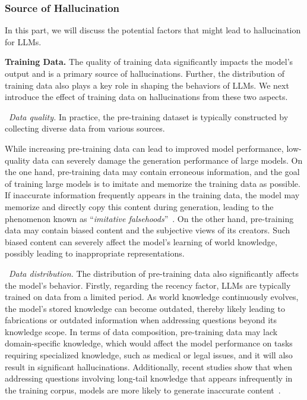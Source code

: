 \subsubsection{Source of Hallucination}

In this part, we will discuss the potential factors that might lead to hallucination for LLMs.

\textbf{Training Data.} The quality of training data significantly impacts the model's output and is a primary source of hallucinations. Further, the distribution of training data also plays a key role in shaping the behaviors of LLMs. We next introduce the effect of training data on hallucinations from these two aspects. 

\textbullet~\emph{Data quality.} In practice, the pre-training dataset is typically constructed by collecting diverse data from various sources. 

While increasing pre-training data can lead to improved model performance, low-quality data can severely damage the generation performance of large models. On the one hand, pre-training data may contain erroneous information, and the goal of training large models is to imitate and memorize the training data as possible. If inaccurate information frequently appears in the training data, the model may memorize and directly copy this content during generation, leading to the phenomenon known as ``\emph{imitative falsehoods}''~\cite{Lin-ACL-2022-TruthfulQA}. On the other hand, pre-training data may contain biased content and the subjective views of its creators. Such biased content can severely affect the model's learning of world knowledge, possibly leading to inappropriate representations.

\textbullet~\emph{Data distribution.} The distribution of pre-training data also significantly affects the model's behavior. Firstly, regarding the recency factor, LLMs are typically trained on data from a limited period. As world knowledge continuously evolves, the model's stored knowledge can become outdated, thereby likely leading to fabrications or outdated information when addressing questions beyond its knowledge scope. In terms of data composition, pre-training data may lack domain-specific knowledge, which would affect the model performance on tasks requiring specialized knowledge, such as medical or legal issues, and it will also result in significant hallucinations. Additionally, recent studies show that when addressing questions involving long-tail knowledge that appears infrequently in the training corpus, models are more likely to generate inaccurate content~\cite{Li-arxiv-2024-dawn}.

